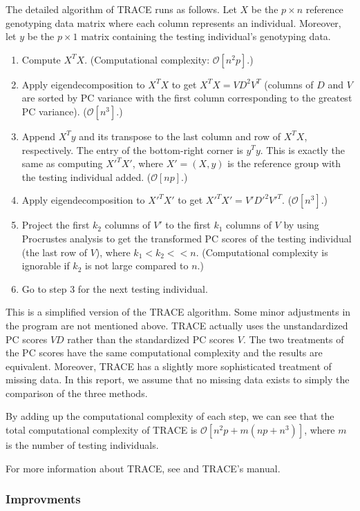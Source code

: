 \documentclass{article}[12pt]
\newcommand{\bO}{\mathcal{O}}
\begin{document}
The detailed algorithm of TRACE runs as follows.
Let $X$ be the $p \times n$ reference genotyping data matrix where each column represents an individual.
Moreover, let $y$ be the $p \times 1$ matrix containing the testing individual's genotyping data.
\begin{enumerate}
\item Compute $X^T X$.
  (Computational complexity: $\bO[n^2p]$.)  
\item Apply eigendecomposition to $X^T X$ to get $X^T X = V D^2 V^T$ (columns of $D$ and $V$ are sorted by PC variance with the first column corresponding to the greatest PC variance).
  ($\bO[n^3]$.)
\item Append $X^T y$ and its transpose to the last column and row of $X^T X$, respectively.
  The entry of the bottom-right corner is $y^T y$.
  This is exactly the same as computing $X'^T X'$,
  where $X' = (X, y)$ is the reference group with the testing individual added.
  ($\bO[np]$.)
\item Apply eigendecomposition to $X'^T X'$ to get $X'^T X' = V' D'^2 V'^T$.
  ($\bO[n^3]$.)
\item Project the first $k_2$ columns of $V'$ to the first $k_1$ columns of $V$ by using Procrustes analysis to get the transformed PC scores of the testing individual (the last row of $V$),
  where $k_1 < k_2 << n$.
  (Computational complexity is ignorable if $k_2$ is not large compared to $n$.)
  \item Go to step 3 for the next testing individual.
\end{enumerate}

This is a simplified version of the TRACE algorithm.
Some minor adjustments in the program are not mentioned above.
TRACE actually uses the unstandardized PC scores $VD$ rather than the standardized PC scores $V$.
The two treatments of the PC scores have the same computational complexity and the results are equivalent.
Moreover, TRACE has a slightly more sophisticated treatment of missing data.
In this report, we assume that no missing data exists to simply the comparison of the three methods.

By adding up the computational complexity of each step, we can see that the total computational complexity of TRACE is $\bO[n^2p + m(np + n^3)]$,
where $m$ is the number of testing individuals.

For more information about TRACE,
see \cite{wang} and TRACE's manual.

\subsubsection{Improvments}
\end{document}

